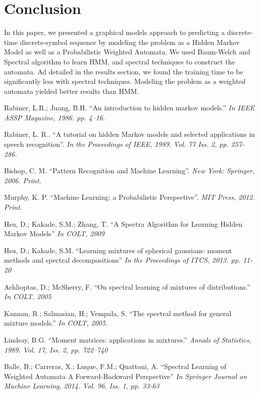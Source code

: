\documentclass[letterpaper]{article}
\begin{document}
\section{Conclusion}
In this paper, we presented a graphical models approach to predicting a discrete-time discrete-symbol sequence by modeling the problem as a Hidden Markov Model as well as a Probabilistic Weighted Automata. We used Baum-Welch and Spectral algorithm to learn HMM, and spectral techniques to construct the automata. Ad detailed in the results section, we found the training time to be significantly less with spectral techniques. Modeling the problem as a weighted automata yielded better results than HMM.




\begin{thebibliography}{9}
	Rabiner, L.R.; Juang, B.H. \enquote{An introduction to hidden markov models.} \textit{In IEEE ASSP Magazine, 1986. pp. 4–16.}
			
	Rabiner, L. R.. \enquote{A tutorial on hidden Markov models and selected applications in speech recognition}. \textit{In the Proceedings of IEEE, 1989. Vol. 77 Iss. 2, pp. 257-286.}
		
	Bishop, C. M. \enquote{Pattern Recognition and Machine Learning}. \textit{New York: Springer, 2006. Print.}
		
	Murphy, K. P. \enquote{Machine Learning: a Probabilistic Perspective}. \textit{MIT Press, 2012. Print.}
		
	Hsu, D.; Kakade, S.M.; Zhang, T. \enquote{A Spectra Algorithm for Learning Hidden Markov Models} \textit{In COLT, 2009}
		
	Hsu, D.; Kakade, S.M. \enquote{Learning mixtures of spherical gaussians: moment methods and spectral decompositions} \textit{In the Proceedings of ITCS, 2013. pp. 11-20}	
	
	Achlioptas, D.; McSherry, F. \enquote{On spectral learning of mixtures of distributions.} \textit{In COLT, 2005}
		
	Kannan, R.; Salmasian, H.; Vempala, S. \enquote{The spectral method for general mixture models.} \textit{In COLT, 2005.}
		
	Lindsay, B.G. \enquote{Moment matrices: applications in mixtures.} \textit{Annals of Statistics, 1989. Vol. 17, Iss. 2, pp. 722–740}
	
	Balle, B.; Carreras, X.; Luque, F.M.; Quattoni, A. \enquote{Spectral Learning of Weighted Automata A Forward-Backward Perspective} \textit{In Springer Journal on Machine Learning, 2014. Vol. 96, Iss. 1, pp. 33-63}
	        
\end{thebibliography}
\end{document}

